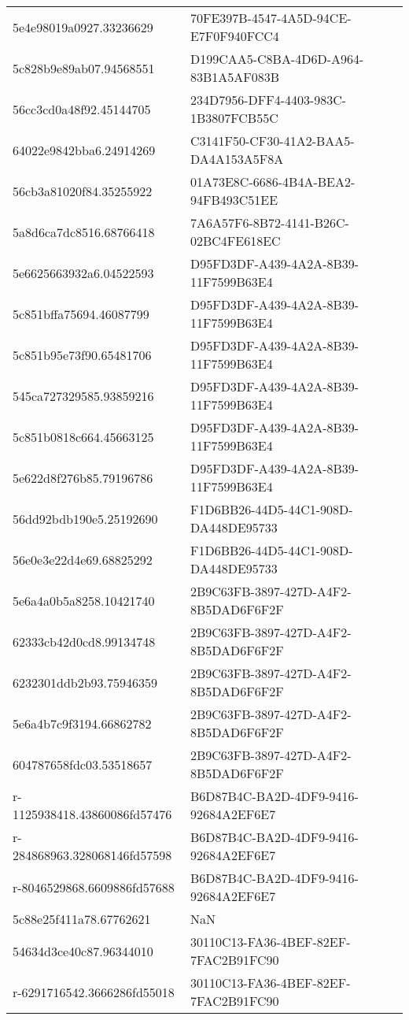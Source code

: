 \begin{tabular}{ll}
5e4e98019a0927.33236629 & 70FE397B-4547-4A5D-94CE-E7F0F940FCC4 \\
5c828b9e89ab07.94568551 & D199CAA5-C8BA-4D6D-A964-83B1A5AF083B \\
56cc3cd0a48f92.45144705 & 234D7956-DFF4-4403-983C-1B3807FCB55C \\
64022e9842bba6.24914269 & C3141F50-CF30-41A2-BAA5-DA4A153A5F8A \\
56cb3a81020f84.35255922 & 01A73E8C-6686-4B4A-BEA2-94FB493C51EE \\
5a8d6ca7dc8516.68766418 & 7A6A57F6-8B72-4141-B26C-02BC4FE618EC \\
5e6625663932a6.04522593 & D95FD3DF-A439-4A2A-8B39-11F7599B63E4 \\
5c851bffa75694.46087799 & D95FD3DF-A439-4A2A-8B39-11F7599B63E4 \\
5c851b95e73f90.65481706 & D95FD3DF-A439-4A2A-8B39-11F7599B63E4 \\
545ca727329585.93859216 & D95FD3DF-A439-4A2A-8B39-11F7599B63E4 \\
5c851b0818c664.45663125 & D95FD3DF-A439-4A2A-8B39-11F7599B63E4 \\
5e622d8f276b85.79196786 & D95FD3DF-A439-4A2A-8B39-11F7599B63E4 \\
56dd92bdb190e5.25192690 & F1D6BB26-44D5-44C1-908D-DA448DE95733 \\
56e0e3e22d4e69.68825292 & F1D6BB26-44D5-44C1-908D-DA448DE95733 \\
5e6a4a0b5a8258.10421740 & 2B9C63FB-3897-427D-A4F2-8B5DAD6F6F2F \\
62333cb42d0cd8.99134748 & 2B9C63FB-3897-427D-A4F2-8B5DAD6F6F2F \\
6232301ddb2b93.75946359 & 2B9C63FB-3897-427D-A4F2-8B5DAD6F6F2F \\
5e6a4b7c9f3194.66862782 & 2B9C63FB-3897-427D-A4F2-8B5DAD6F6F2F \\
604787658fdc03.53518657 & 2B9C63FB-3897-427D-A4F2-8B5DAD6F6F2F \\
r-1125938418.43860086fd57476 & B6D87B4C-BA2D-4DF9-9416-92684A2EF6E7 \\
r-284868963.328068146fd57598 & B6D87B4C-BA2D-4DF9-9416-92684A2EF6E7 \\
r-8046529868.6609886fd57688 & B6D87B4C-BA2D-4DF9-9416-92684A2EF6E7 \\
5c88e25f411a78.67762621 & NaN \\
54634d3ce40c87.96344010 & 30110C13-FA36-4BEF-82EF-7FAC2B91FC90 \\
r-6291716542.3666286fd55018 & 30110C13-FA36-4BEF-82EF-7FAC2B91FC90 \\

\end{tabular}
